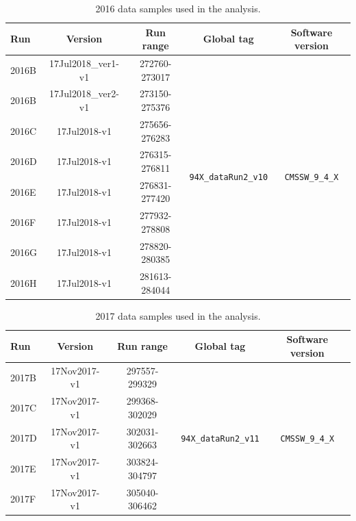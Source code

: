 \begin{table}[h]
  \begin{center}
    \caption{\label{tab:dataSamples2016} 2016 data samples used in the analysis.}
      \begin{tabular}{|l|c|c|c|c|}
      \hline
      Run   & Version            & Run range
      & Global tag & Software version \\
      \hline\hline
      2016B & 17Jul2018\_ver1-v1 & 272760-273017     &
      \multirow{8}{*}{\texttt{\small 94X\_dataRun2\_v10}} &
      \multirow{8}{*}{\texttt{\small CMSSW\_9\_4\_X}} \\
      2016B & 17Jul2018\_ver2-v1 & 273150-275376 & &\\
      2016C & 17Jul2018-v1       & 275656-276283 & &\\
      2016D & 17Jul2018-v1       & 276315-276811 & &\\
      2016E & 17Jul2018-v1       & 276831-277420 & &\\
      2016F & 17Jul2018-v1       & 277932-278808 & &\\
      2016G & 17Jul2018-v1       & 278820-280385 & &\\
      2016H & 17Jul2018-v1       & 281613-284044 & &\\
      \hline
    \end{tabular}    
  \end{center}
\end{table}
\begin{table}[h]
  \begin{center}
    \caption{\label{tab:dataSamples2017} 2017 data samples used in the analysis.}
      \begin{tabular}{|l|c|c|c|c|}
      \hline
      Run   & Version      & Run range
      & Global tag & Software version \\
      \hline\hline
      2017B & 17Nov2017-v1 & 297557-299329 &
      \multirow{5}{*}{\texttt{\small 94X\_dataRun2\_v11}} &
      \multirow{5}{*}{\texttt{\small CMSSW\_9\_4\_X}} \\
      2017C & 17Nov2017-v1 & 299368-302029 & &   \\
      2017D & 17Nov2017-v1 & 302031-302663 & &   \\
      2017E & 17Nov2017-v1 & 303824-304797 & &   \\
      2017F & 17Nov2017-v1 & 305040-306462 & &   \\
      \hline
    \end{tabular}    
  \end{center}
\end{table}
